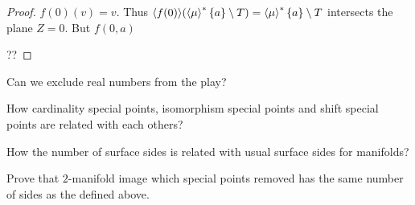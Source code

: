 \begin{proof}
$f (0) (v) = v$. Thus $\langle f (0) \rangle (\left\langle \mu\right\rangle ^{\ast} \{ a
\} \setminus T) = \left\langle \mu\right\rangle ^{\ast} \{ a \} \setminus T$ intersects
the plane $Z = 0$. But $f (0, a)$

??
\end{proof}

\begin{question}
Can we exclude real numbers from the play?
\end{question}

\begin{question}
How cardinality special points, isomorphism special points and shift
special points are related with each others?
\end{question}

\begin{question}
How the number of surface sides is related with usual surface sides for
manifolds?
\end{question}

Prove that $2$-manifold image which special points removed has the same number
of sides as the defined above.
